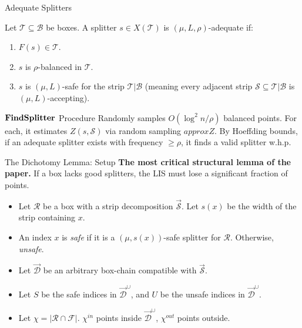 \documentclass[11pt,aspectratio=169]{beamer}
\newcommand{\findsplitter}{{\rm {\bf FindSplitter}}}
\begin{document}
\begin{frame}{Adequate Splitters}
    \begin{definition}
        Let $\mathcal{T} \subseteq \mathcal{B}$ be boxes. A splitter $s \in X(\mathcal{T})$ is $(\mu, L, \rho)$-adequate if:
        \begin{enumerate}
            \item $F(s) \in \mathcal{T}$.
            \item $s$ is $\rho$-balanced in $\mathcal{T}$.
            \item $s$ is $(\mu, L)$-safe for the strip $\mathcal{T}|\mathcal{B}$ (meaning every adjacent strip $\mathcal{S} \subseteq \mathcal{T}|\mathcal{B}$ is $(\mu, L)$-accepting).
        \end{enumerate}
    \end{definition}
    
    \begin{block}{$\findsplitter$ Procedure}
        Randomly samples $O(\log^2 n / \rho)$ balanced points. For each, it estimates $Z(s, \mathcal{S})$ via random sampling $approxZ$. By Hoeffding bounds, if an adequate splitter exists with frequency $\geq \rho$, it finds a valid splitter w.h.p.
    \end{block}
\end{frame}

\begin{frame}{The Dichotomy Lemma: Setup}
    \textbf{The most critical structural lemma of the paper.} If a box lacks good splitters, the LIS must lose a significant fraction of points.
    
    \begin{itemize}
        \item Let $\mathcal{R}$ be a box with a strip decomposition $\vec{\mathcal{S}}$. Let $s(x)$ be the width of the strip containing $x$.
        \item An index $x$ is \emph{safe} if it is a $(\mu, s(x))$-safe splitter for $\mathcal{R}$. Otherwise, \emph{unsafe}.
        \item Let $\vec{\mathcal{D}}$ be an arbitrary box-chain compatible with $\vec{\mathcal{S}}$.
        \item Let $S$ be the safe indices in $\vec{\mathcal{D}}^\cup$, and $U$ be the unsafe indices in $\vec{\mathcal{D}}^\cup$.
        \item Let $\chi = |\mathcal{R} \cap \mathcal{F}|$. $\chi^{in}$ points inside $\vec{\mathcal{D}}^\cup$, $\chi^{out}$ points outside.
    \end{itemize}
\end{frame}
\end{document}
